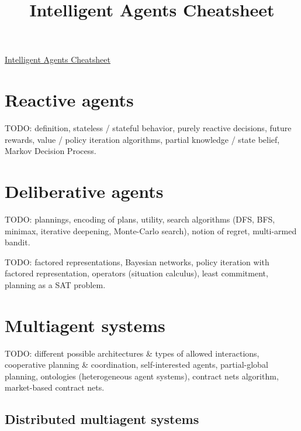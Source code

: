 \documentclass[10pt,a4paper,landscape]{article}
\begin{document}
\title{Intelligent Agents Cheatsheet}

\raggedright
\footnotesize
\sffamily
\begin{multicols*}{4}

\setlength{\premulticols}{1pt}
\setlength{\postmulticols}{1pt}
\setlength{\multicolsep}{1pt}
\setlength{\columnsep}{2pt}

\begin{center}
\Large{\underline{Intelligent Agents Cheatsheet}}
\end{center}

\section{Reactive agents}

TODO: definition, stateless / stateful behavior, purely reactive decisions, future rewards, value / policy iteration algorithms, partial knowledge / state belief, Markov Decision Process.

\section{Deliberative agents}

TODO: plannings, encoding of plans, utility, search algorithms (DFS, BFS, minimax, iterative deepening, Monte-Carlo search), notion of regret, multi-armed bandit.

TODO: factored representations, Bayesian networks, policy iteration with factored representation, operators (situation calculus), least commitment, planning as a SAT problem.

\section{Multiagent systems}

TODO: different possible architectures \& types of allowed interactions, cooperative planning \& coordination, self-interested agents, partial-global planning, ontologies (heterogeneous agent systems), contract nets algorithm, market-based contract nets.

\subsection{Distributed multiagent systems}


\end{multicols*}
\end{document}
